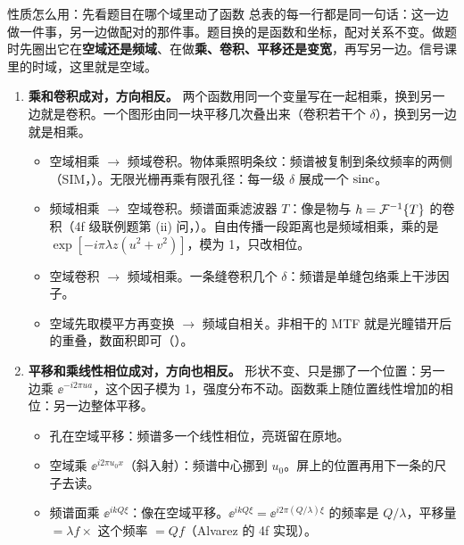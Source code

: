 \begin{recipe}[label=rcp:ftuse]{性质怎么用：先看题目在哪个域里动了函数}
总表的每一行都是同一句话：这一边做一件事，另一边做配对的那件事。题目换的是函数和坐标，配对关系不变。做题时先圈出它在\textbf{空域还是频域}、在做\textbf{乘、卷积、平移还是变宽}，再写另一边。信号课里的时域，这里就是空域。

\begin{enumerate}
\item \textbf{乘和卷积成对，方向相反。}
两个函数用同一个变量写在一起相乘，换到另一边就是卷积。一个图形由同一块平移几次叠出来（卷积若干个 $\delta$），换到另一边就是相乘。
\begin{itemize}
\item 空域相乘 $\to$ 频域卷积。物体乘照明条纹：频谱被复制到条纹频率的两侧（SIM，\pageref{ex:v-sim}）。无限光栅再乘有限孔径：每一级 $\delta$ 展成一个 $\operatorname{sinc}$。
\item 频域相乘 $\to$ 空域卷积。频谱面乘滤波器 $T$：像是物与 $h=\mathcal{F}^{-1}\{T\}$ 的卷积（4f 级联例题第 (ii) 问，\pageref{ex:v-4f2}）。自由传播一段距离也是频域相乘，乘的是 $\exp[-i\pi\lambda z(u^2+v^2)]$，模为 1，只改相位。
\item 空域卷积 $\to$ 频域相乘。一条缝卷积几个 $\delta$：频谱是单缝包络乘上干涉因子。
\item 空域先取模平方再变换 $\to$ 频域自相关。非相干的 MTF 就是光瞳错开后的重叠，数面积即可（\pageref{rcp:mtfoverlap}）。
\end{itemize}

\item \textbf{平移和乘线性相位成对，方向也相反。}
形状不变、只是挪了一个位置：另一边乘 $\ee^{-i2\pi ua}$，这个因子模为 1，强度分布不动。函数乘上随位置线性增加的相位：另一边整体平移。
\begin{itemize}
\item 孔在空域平移：频谱多一个线性相位，亮斑留在原地。
\item 空域乘 $\ee^{i2\pi u_0 x}$（斜入射）：频谱中心挪到 $u_0$。屏上的位置再用下一条的尺子去读。
\item 频谱面乘 $\ee^{ikQ\xi}$：像在空域平移。$\ee^{ikQ\xi}=\ee^{i2\pi(Q/\lambda)\xi}$ 的频率是 $Q/\lambda$，平移量 $=\lambda f\times$ 这个频率 $=Qf$（Alvarez 的 4f 实现）。
\end{itemize}


\end{enumerate}
\end{recipe}
